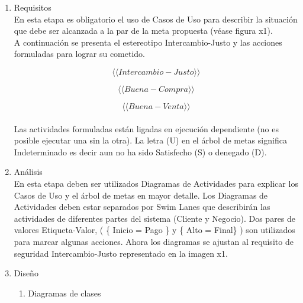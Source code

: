 \documentclass[runningheads,a4paper]{llncs}
\begin{document}
\begin{enumerate}
	\item Requisitos\\ 

En esta etapa es obligatorio el uso de Casos de Uso para describir la situación que debe ser alcanzada a la par de la meta propuesta (véase figura x1).\\

A continuación se presenta el estereotipo Intercambio-Justo y las acciones formuladas para lograr su cometido. 

	 \[ \langle \langle Intercambio-Justo \rangle \rangle\] \begin{center}

	\end{center} \[ \langle \langle Buena-Compra \rangle \rangle\] \begin{center}

	\end{center} \[ \langle \langle Buena-Venta \rangle \rangle\]\\
	
	Las actividades formuladas están ligadas en ejecución dependiente (no es posible ejecutar una sin la otra). La letra (U) en el árbol de metas significa Indeterminado es decir aun no ha sido Satisfecho (S) o denegado (D).\\
	
	\item Análisis  \\
	
En esta etapa  deben ser utilizados Diagramas de Actividades para explicar los Casos de Uso y el árbol de metas en mayor detalle. Los Diagramas de Actividades deben estar separados por \gls{Swim Lanes} que describirán las actividades de diferentes partes del sistema (Cliente y Negocio). Dos pares de valores  Etiqueta-Valor, ( \{ Inicio = Pago \} y \{ Alto = Final\} ) son utilizados para marcar algunas acciones. Ahora los diagramas se ajustan al requisito de seguridad Intercambio-Justo representado en la imagen x1.\\ 

	\item Diseño \\
	
		\begin{enumerate}
			\item Diagramas de clases\\


\end{enumerate}
\end{enumerate}
\end{document}
